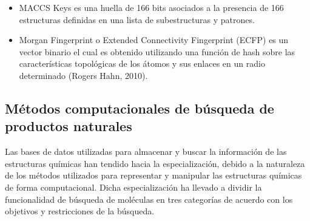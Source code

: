 \begin{itemize}
    \begin{itemize}
        \item MACCS Keys es una huella de 166 bits asociados a la presencia de 166 estructuras definidas en una lista de subestructuras y patrones.
        \item Morgan Fingerprint o Extended Connectivity Fingerprint (ECFP) es un vector binario el cual es obtenido utilizando una función de hash sobre las características topológicas de los átomos y sus enlaces en un radio determinado (Rogers  Hahn, 2010).
    \end{itemize}
\end{itemize}



\subsection{Métodos computacionales de búsqueda de productos naturales}


Las bases de datos utilizadas para almacenar y buscar la información de las estructuras químicas han tendido hacia la especialización, debido a la naturaleza de los métodos utilizados para representar y manipular las estructuras químicas de forma computacional. Dicha especialización ha llevado a dividir la funcionalidad de búsqueda de moléculas en tres categorías de acuerdo con los objetivos y restricciones de la búsqueda.

